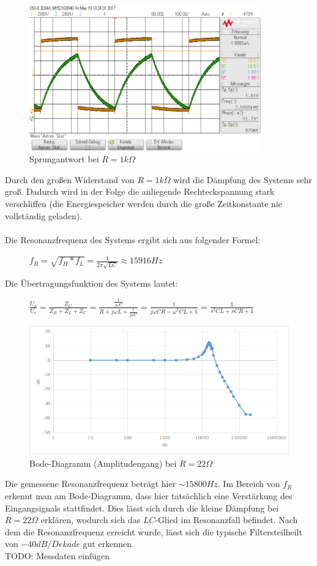 \documentclass[12pt,a4paper,titlepage]{article}
\begin{document}
\begin{figure}[H]
  \centering
  \includegraphics[width=100mm]{sprungantwort_rlc_1k.png}
  \caption{Sprungantwort bei $R=1k\Omega$}
\end{figure}
\noindent Durch den großen Widerstand von $R=1k\Omega$ wird die D\"ampfung des Systems sehr groß. Dadurch wird in der Folge die anliegende Rechteckspannung stark verschliffen (die Energiespeicher werden durch die große Zeitkonstante nie vollst\"andig geladen).\\\\
Die Resonanzfrequenz des Systems ergibt sich aus folgender Formel:
\begin{figure}[H]
  \centering
  $f_R = \sqrt{f_H*f_L} = \frac{1}{2\pi\sqrt{LC}} \approx 15916Hz$
\end{figure}

\noindent Die \"Ubertragungsfunktion des Systems lautet:
\begin{figure}[H]
  \centering
  $\frac{U_a}{U_e} = \frac{Z_C}{Z_R+Z_L+Z_C} = \frac{\frac{1}{j\omega C}}{R+j\omega L+\frac{1}{j\omega C}} = \frac{1}{j\omega CR-\omega^2CL+1} = \frac{1}{s^2CL+sCR+1}$
\end{figure}

\begin{figure}[H]
  \centering
  \includegraphics[width=150mm]{bode_rlc_22.png}
  \caption{Bode-Diagramm (Amplitudengang) bei $R=22\Omega$}
\end{figure}
\noindent Die gemessene Resonanzfrequenz betr\"agt hier $\sim15800Hz$. Im Bereich von $f_R$ erkennt man am Bode-Diagramm, dass hier tats\"achlich eine Verstärkung des Eingangsignals stattfindet. Dies lässt sich durch die kleine Dämpfung bei $R=22\Omega$ erkl\"aren, wodurch sich das $LC$-Glied im Resonanzfall befindet. Nach dem die Resonanzfrequenz erreicht wurde, lässt sich die typische Filtersteilheilt von $-40dB/Dekade$ gut erkennen.\\
TODO: Messdaten einfügen
\end{document}
